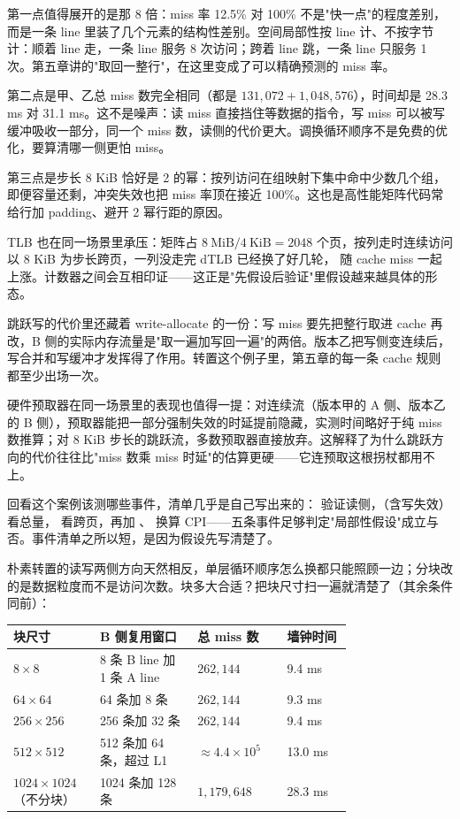 第一点值得展开的是那 8 倍：miss 率 12.5\% 对 100\% 不是"快一点"的程度差别，而是一条 line 里装了几个元素的结构性差别。空间局部性按 line 计、不按字节计：顺着 line 走，一条 line 服务 8 次访问；跨着 line 跳，一条 line 只服务 1 次。第五章讲的"取回一整行"，在这里变成了可以精确预测的 miss 率。

第二点是甲、乙总 miss 数完全相同（都是 $131{,}072+1{,}048{,}576$），时间却是 28.3 ms 对 31.1 ms。这不是噪声：读 miss 直接挡住等数据的指令，写 miss 可以被写缓冲吸收一部分，同一个 miss 数，读侧的代价更大。调换循环顺序不是免费的优化，要算清哪一侧更怕 miss。

第三点是步长 8 KiB 恰好是 2 的幂：按列访问在组映射下集中命中少数几个组，即便容量还剩，冲突失效也把 miss 率顶在接近 100\%。这也是高性能矩阵代码常给行加 padding、避开 2 幂行距的原因。

TLB 也在同一场景里承压：矩阵占 $8\ \mathrm{MiB}/4\ \mathrm{KiB}=2048$ 个页，按列走时连续访问以 8 KiB 为步长跨页，一列没走完 dTLB 已经换了好几轮， 随 cache miss 一起上涨。计数器之间会互相印证——这正是"先假设后验证"里假设越来越具体的形态。

跳跃写的代价里还藏着 write-allocate 的一份：写 miss 要先把整行取进 cache 再改，B 侧的实际内存流量是"取一遍加写回一遍"的两倍。版本乙把写侧变连续后，写合并和写缓冲才发挥得了作用。转置这个例子里，第五章的每一条 cache 规则都至少出场一次。

硬件预取器在同一场景里的表现也值得一提：对连续流（版本甲的 A 侧、版本乙的 B 侧），预取器能把一部分强制失效的时延提前隐藏，实测时间略好于纯 miss 数推算；对 8 KiB 步长的跳跃流，多数预取器直接放弃。这解释了为什么跳跃方向的代价往往比"miss 数乘 miss 时延"的估算更硬——它连预取这根拐杖都用不上。

回看这个案例该测哪些事件，清单几乎是自己写出来的： 验证读侧，（含写失效）看总量， 看跨页，再加 、 换算 CPI——五条事件足够判定"局部性假设"成立与否。事件清单之所以短，是因为假设先写清楚了。

朴素转置的读写两侧方向天然相反，单层循环顺序怎么换都只能照顾一边；分块改的是数据粒度而不是访问次数。块多大合适？把块尺寸扫一遍就清楚了（其余条件同前）：

\begin{longtable}{L{0.16\linewidth}L{0.24\linewidth}L{0.20\linewidth}L{0.16\linewidth}}
\toprule
块尺寸 & B 侧复用窗口 & 总 miss 数 & 墙钟时间 \\
\midrule
$8\times8$ & 8 条 B line 加 1 条 A line & $262{,}144$ & 9.4 ms \\
$64\times64$ & 64 条加 8 条 & $262{,}144$ & 9.3 ms \\
$256\times256$ & 256 条加 32 条 & $262{,}144$ & 9.4 ms \\
$512\times512$ & 512 条加 64 条，超过 L1 & $\approx4.4\times10^{5}$ & 13.0 ms \\
$1024\times1024$（不分块） & 1024 条加 128 条 & $1{,}179{,}648$ & 28.3 ms \\
\bottomrule
\end{longtable}

